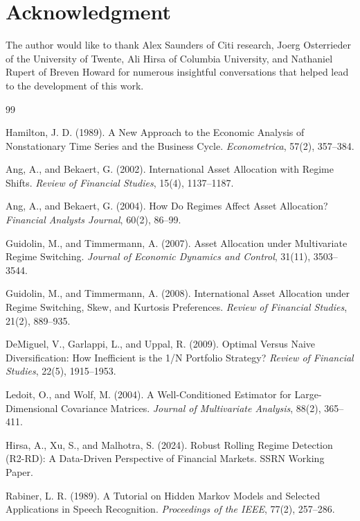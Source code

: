 \documentclass[11pt]{article}
\begin{document}
\section{Acknowledgment}
The author would like to thank Alex Saunders of Citi research, Joerg Osterrieder of the University of Twente, Ali Hirsa of Columbia University, and Nathaniel Rupert of Breven Howard for numerous insightful conversations that helped lead to the development of this work.
\begin{thebibliography}{99}

Hamilton, J. D. (1989).
\newblock A New Approach to the Economic Analysis of Nonstationary Time Series and the Business Cycle.
\newblock \emph{Econometrica}, 57(2), 357--384.

Ang, A., and Bekaert, G. (2002).
\newblock International Asset Allocation with Regime Shifts.
\newblock \emph{Review of Financial Studies}, 15(4), 1137--1187.

Ang, A., and Bekaert, G. (2004).
\newblock How Do Regimes Affect Asset Allocation?
\newblock \emph{Financial Analysts Journal}, 60(2), 86--99.

Guidolin, M., and Timmermann, A. (2007).
\newblock Asset Allocation under Multivariate Regime Switching.
\newblock \emph{Journal of Economic Dynamics and Control}, 31(11), 3503--3544.

Guidolin, M., and Timmermann, A. (2008).
\newblock International Asset Allocation under Regime Switching, Skew, and Kurtosis Preferences.
\newblock \emph{Review of Financial Studies}, 21(2), 889--935.

DeMiguel, V., Garlappi, L., and Uppal, R. (2009).
\newblock Optimal Versus Naive Diversification: How Inefficient is the 1/N Portfolio Strategy?
\newblock \emph{Review of Financial Studies}, 22(5), 1915--1953.

Ledoit, O., and Wolf, M. (2004).
\newblock A Well-Conditioned Estimator for Large-Dimensional Covariance Matrices.
\newblock \emph{Journal of Multivariate Analysis}, 88(2), 365--411.

Hirsa, A., Xu, S., and Malhotra, S. (2024).
\newblock Robust Rolling Regime Detection (R2-RD): A Data-Driven Perspective of Financial Markets.
\newblock SSRN Working Paper.

Rabiner, L. R. (1989).
\newblock A Tutorial on Hidden Markov Models and Selected Applications in Speech Recognition.
\newblock \emph{Proceedings of the IEEE}, 77(2), 257--286.


\end{thebibliography}
\end{document}
